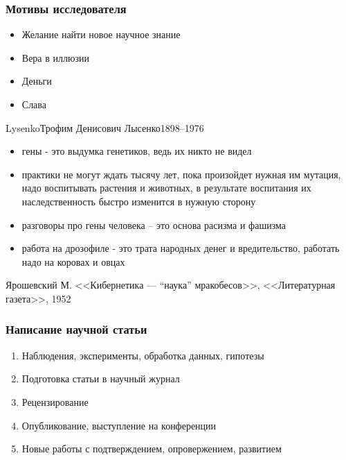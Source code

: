 \documentclass[aspectratio=169]{beamer}
\begin{document}
\begin{bframe}\frametitle{Мотивы исследователя}
\begin{itemize}
\item<+-> Желание найти новое научное знание
\item<+-> Вера в иллюзии
\item<+-> Деньги
\item<+-> Слава
\end{itemize}
\end{bframe}



\begin{Person}{Lysenko}{Трофим Денисович Лысенко}{1898--1976}
\begin{itemize}
\item  гены - это выдумка генетиков, ведь их никто не видел
\item  практики не могут ждать тысячу лет, пока произойдет нужная им мутация, 
надо воспитывать растения и животных, в результате воспитания их наследственность 
быстро изменится в нужную сторону
\item разговоры про гены человека -- это основа расизма и фашизма
\item  работа на дрозофиле - это трата народных денег и вредительство, 
работать надо на коровах и овцах
\end{itemize}
\end{Person}


\begin{bframe}
{
Ярошевский М. <<Кибернетика — ``наука'' мракобесов>>, <<Литературная газета>>, 1952
}
\end{bframe}

\begin{bframe}\frametitle{Написание научной статьи}
\begin{enumerate}
\item<+-> Наблюдения, эксперименты, обработка данных, гипотезы
\item<+-> Подготовка статьи в научный журнал
\item<+-> Рецензирование
\item<+-> Опубликование, выступление на конференции
\item<+-> Новые работы с подтверждением, опровержением, развитием
\end{enumerate}
\end{bframe}
\end{document}
